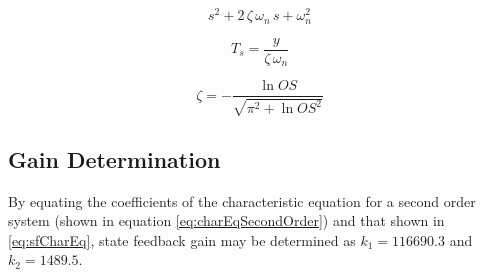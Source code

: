 \begin{equation}
	\label{eq:charEqSecondOrder}
	s^2 + 2\,\zeta\,\omega_n\,s + \omega_n^2
\end{equation}

\begin{equation}
	\label{eq:sfSecondOrderTS}
	T_{s} = {\frac {y}{\zeta \, \omega_n}}
\end{equation}

\begin{equation}
	\label{eq:sfSecondOrderOS}
	\zeta = -{\frac {\ln{OS}}{\sqrt{{\pi}^{2}+{\ln{OS}}^{2}}}}
\end{equation}

\subsection{Gain Determination}

By equating the coefficients of the characteristic equation for a second order system (shown in equation \ref{eq:charEqSecondOrder}) and that shown in \ref{eq:sfCharEq}, state feedback gain may be determined as $k_1 = 116690.3$ and $k_2 = 1489.5$.

